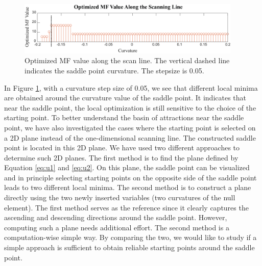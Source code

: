 \begin{figure}[h!]
    \centering
    \includegraphics[width=0.95\textwidth]{chapter-4/figures/Scanning_Line_plot.png}
    \caption{Optimized MF value along the scan line. The vertical dashed line indicates the saddle point curvature. The stepsize is 0.05.}
    \label{fig: scanning_line}
\end{figure}
\newpage
In Figure \ref{fig: scanning_line}, with a curvature step size of 0.05, we see that different local minima are obtained around the curvature value of the saddle point. It indicates that near the saddle point, the local optimization is still sensitive to the choice of the starting point. To better understand the basin of attractions near the saddle point, we have also investigated the cases where the starting point is selected on a 2D plane instead of the one-dimensional scanning line. The constructed saddle point is located in this 2D plane. We have used two different approaches to determine such 2D planes. The first method is to find the plane defined by Equation \ref{eq:u1} and \ref{eq:u2}. On this plane, the saddle point can be visualized and in principle selecting starting points on the opposite side of the saddle point leads to two different local minima. The second method is to construct a plane directly using the two newly inserted variables (two curvatures of the null element). The first method serves as the reference since it clearly captures the ascending and descending directions around the saddle point. However, computing such a plane needs additional effort. The second method is a computation-wise simple way. By comparing the two, we would like to study if a simple approach is sufficient to obtain reliable starting points around the saddle point. 

